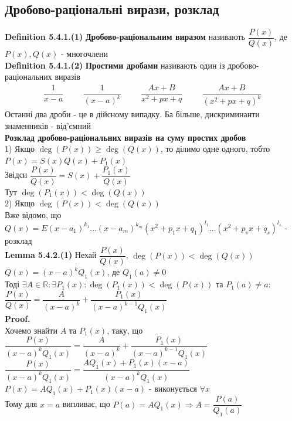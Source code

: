 \documentclass[a4paper, 14pt]{extarticle}
\def\defin#1{\textbf{Definition {#1}}}
\def\lm#1{\textbf{Lemma {#1}}}
\def\proof{\textbf{Proof.}\\}
\def\bigline{\vspace{5mm}\\}
\begin{document}
\subsection{Дробово-раціональні вирази, розклад}
\defin{5.4.1.(1)} \textbf{Дробово-раціональним виразом} називають $\dfrac{P(x)}{Q(x)}$, де $P(x),Q(x)$ - многочлени
\bigline
\defin{5.4.1.(2)} \textbf{Простими дробами} називають один із дробово-\\раціональних виразів
\begin{align*}
\dfrac{1}{x-a} \hspace{1cm} \dfrac{1}{(x-a)^k} \hspace{1cm} \dfrac{Ax+B}{x^2+px+q} \hspace{1cm} \dfrac{Ax+B}{(x^2+px+q)^k}
\end{align*}
Останні два дроби - це в дійсному випадку. Ба більше, дискриминанти знаменників - від'ємний
\bigline
\textbf{Розклад дробово-раціональних виразів на суму простих дробов}\\
1) Якщо $\deg(P(x)) \geq \deg(Q(x))$, то ділимо одне одного, тобто\\
$P(x) = S(x)Q(x) + P_1(x)$\\
Звідси $\dfrac{P(x)}{Q(x)} = S(x) + \dfrac{P_1(x)}{Q(x)}$\\
Тут $\deg(P_1(x)) < \deg(Q(x))$
\bigline
2) Якщо $\deg(P(x)) < \deg(Q(x))$\\
Вже відомо, що \\ $Q(x) = E(x-a_1)^{k_1} \dots (x-a_m)^{k_m} (x^2+p_1x+q_1)^{l_1} \dots (x^2+p_s x+q_s)^{l_s}$ - розклад
\bigline
\lm{5.4.2.(1)} Нехай $\dfrac{P(x)}{Q(x)}$, $\deg(P(x)) < \deg(Q(x))$\\
$Q(x) = (x-a)^k Q_1(x)$, де $Q_1(a) \neq 0$\\
Тоді $\exists A \in \mathbb{R}: \exists P_1(x): \deg(P_1(x)) < \deg(P(x))$ та $P_1(a) \neq a:$\\
$\dfrac{P(x)}{Q(x)} = \dfrac{A}{(x-a)^k} + \dfrac{P_1(x)}{(x-a)^{k-1}Q_1(x)}$\\
\proof
Хочемо знайти $A$ та $P_1(x)$, таку, що\\
$\dfrac{P(x)}{(x-a)^kQ_1(x)} = \dfrac{A}{(x-a)^k} + \dfrac{P_1(x)}{(x-a)^{k-1}Q_1(x)}$\\
$\dfrac{P(x)}{(x-a)^k Q_1(x)} = \dfrac{AQ_1(x)+P_1(x)(x-a)}{(x-a)^kQ_1(x)}$\\
$P(x) = AQ_1(x) + P_1(x)(x-a)$ - виконується $\forall x$\\
Тому для $x=a$ випливає, що $P(a) = AQ_1(x) \Rightarrow A = \dfrac{P(a)}{Q_1(a)}$\\
\end{document}

